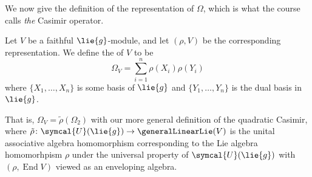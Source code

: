 \documentclass[fleqn]{NotesClass}
\DeclareMathOperator{\End}{End}
\newcommand{\universalenveloping}{\symcal{U}}
\begin{document}
     We now give the definition of the representation of \(\Omega\), which is what the course calls \emph{the} Casimir operator.
     
     \begin{dfn}{}{}
         Let \(V\) be a faithful \(\lie{g}\)-module, and let \((\rho, V)\) be the corresponding representation.
         We define the  of \(V\) to be
         \begin{equation}
             \Omega_V = \sum_{i=1}^n \rho(X_i)\rho(Y_i)
         \end{equation}
         where \(\{X_1, \dotsc, X_n\}\) is some basis of \(\lie{g}\) and \(\{Y_1, \dotsc, Y_n\}\) is the dual basis in \(\lie{g}\).
     \end{dfn}
     
    That is, \(\Omega_V = \tilde{\rho}(\Omega_2)\) with our more general definition of the quadratic Casimir, where \(\tilde{\rho} \colon \universalenveloping(\lie{g}) \to \generalLinearLie(V)\) is the unital associative algebra homomorphism corresponding to the Lie algebra homomorhpism \(\rho\) under the universal property of \(\universalenveloping(\lie{g})\) with \((\rho, \End V)\) viewed as an enveloping algebra.
    
%	
	
	\backmatter
	\renewcommand{\glossaryname}{Acronyms}
	\printglossary[acronym]
	\printindex
\end{document}
